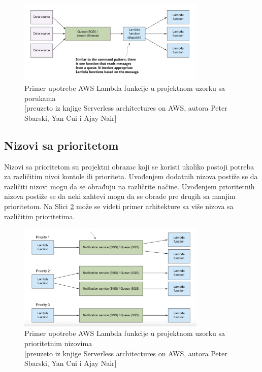\documentclass[12pt,oneside]{memoir}
\begin{document}
\begin{figure}[!ht]
  \centering
  \includegraphics[width=0.8\textwidth]{Slika 13.png}
  \caption{Primer upotrebe AWS Lambda funkcije u projektnom uzorku sa porukama\\\footnotesize[preuzeto iz knjige Serverless architectures on AWS, autora Peter Sbarski, Yan Cui i Ajay Nair]}
  \label{fig:poruke}
\end{figure}
 
\subsection{Nizovi sa prioritetom}
Nizovi sa prioritetom su projektni obrazac koji se koristi ukoliko postoji potreba za različitim nivoi kontole ili prioriteta. Uvođenjem dodatnih nizova postiže se da različiti nizovi mogu da se obrađuju na različrite načine. Uvođenjem prioritetnih nizova postiže se da neki zahtevi mogu da se obrade pre drugih sa manjim prioritetom. Na Slici \ref{fig:nizovi} može se videti primer arhitekture sa više nizova sa različitim prioritetima.

\begin{figure}[!ht]
  \centering
  \includegraphics[width=0.8\textwidth]{Slika 14.png}
  \caption{Primer upotrebe AWS Lambda funkcije u projektnom uzorku sa prioritetnim nizovima\\\footnotesize[preuzeto iz knjige Serverless architectures on AWS, autora Peter Sbarski, Yan Cui i Ajay Nair]}
  \label{fig:nizovi}
\end{figure}
 
\end{document}
